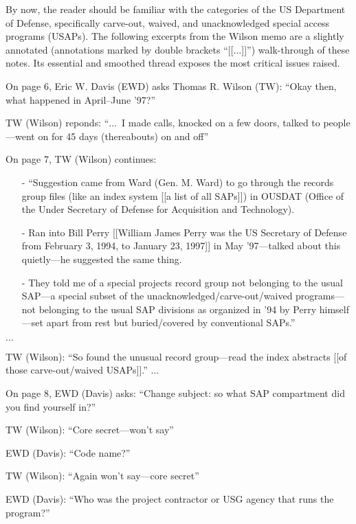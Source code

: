 By now, the reader should be familiar with the categories of the US Department of Defense, specifically carve-out, waived, and unacknowledged special access programs (USAPs). The following excerpts from the Wilson memo are a slightly annotated (annotations marked by double brackets ``[[$\ldots$]]'') walk-through of these notes. Its essential and smoothed thread exposes the most critical issues raised.

\begin{svgraybox}
On page 6, Eric W. Davis (EWD) asks Thomas R. Wilson (TW): ``Okay then, what happened in April--June '97?''

TW (Wilson) reponds: ``$\ldots$~I made calls, knocked on a few doors, talked to people---went on for 45 days (thereabouts) on and off''

On page 7, TW (Wilson) continues:
\begin{enumerate}
\item[-]
``Suggestion came from Ward (Gen. M. Ward) to go through the records group
files (like an index system [[a list of all SAPs]]) in OUSDAT (Office of the Under Secretary of Defense for Acquisition and Technology).
\item[-]
Ran into Bill Perry [[William James Perry  was the US Secretary of Defense from February 3, 1994, to January 23, 1997]] in May '97---talked
about this quietly---he suggested the same thing.
\item[-]
They told me of a special projects record group not belonging to the usual SAP---a
special subset of the unacknowledged/carve-out/waived programs---not
belonging to the usual SAP divisions as organized in '94 by Perry himself---set
apart from rest but buried/covered by conventional SAPs.''
\end{enumerate}
$\ldots$

\noindent TW (Wilson): ``So found the unusual record group---read the index abstracts [[of those carve-out/waived USAPs]].''
$\ldots$



On page 8, EWD (Davis) asks: ``Change subject: so what SAP compartment did you find yourself in?''

\noindent TW (Wilson): ``Core secret---won't say''

\noindent EWD (Davis): ``Code name?''

\noindent TW (Wilson): ``Again won't say---core secret''

\noindent EWD (Davis): ``Who was the project contractor or USG agency that runs the program?''


\end{svgraybox}
